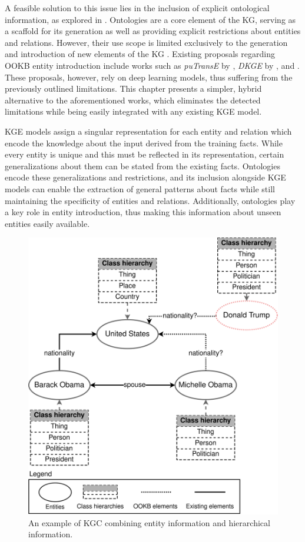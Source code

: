A feasible solution to this issue lies in the inclusion of explicit ontological information, as explored in \cite{Patrick}. Ontologies are a core element of the KG, serving as a scaffold for its generation as well as providing explicit restrictions about entities and relations. However, their use scope is limited exclusively to the generation and introduction of new elements of the KG \citep{paulheim2017knowledge}. Existing proposals regarding OOKB entity introduction include works such as \textit{puTransE} by \cite{putranse}, \textit{DKGE} by \cite{dkge}, \cite{hamaguchi_etal} and \cite{shah_open-world_2019}. These proposals, however, rely on deep learning models, thus suffering from the previously outlined limitations. This chapter presents a simpler, hybrid alternative to the aforementioned works, which eliminates the detected limitations while being easily integrated with any existing KGE model.


KGE models assign a singular representation for each entity and relation which encode the knowledge about the input derived from the training facts. While every entity is unique and this must be reflected in its representation, certain generalizations about them can be stated from the existing facts. Ontologies encode these generalizations and restrictions, and its inclusion alongside KGE models can enable the extraction of general patterns about facts while still maintaining the specificity of entities and relations. Additionally, ontologies play a key role in entity introduction, thus making this information about unseen entities easily available.

\begin{figure}
    \centering
    \includegraphics[width=.6\linewidth]{4_kbsintegrationdl/figures/KGCexample.eps}
    \caption{An example of KGC combining entity information and hierarchical information.}
    \label{fig:kgc_onto_example}
\end{figure}

